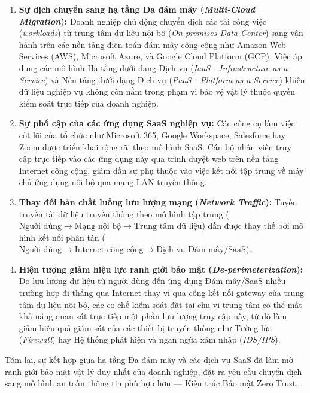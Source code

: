 \begin{enumerate}
    \item \textbf{Sự dịch chuyển sang hạ tầng Đa đám mây (\textit{Multi-Cloud Migration}):} Doanh nghiệp chủ động chuyển dịch các tải công việc (\textit{workloads}) từ trung tâm dữ liệu nội bộ (\textit{On-premises Data Center}) sang vận hành trên các nền tảng điện toán đám mây công cộng như Amazon Web Services (AWS), Microsoft Azure, và Google Cloud Platform (GCP). Việc áp dụng các mô hình Hạ tầng dưới dạng Dịch vụ (\textit{IaaS - Infrastructure as a Service}) và Nền tảng dưới dạng Dịch vụ (\textit{PaaS - Platform as a Service}) khiến dữ liệu nghiệp vụ không còn nằm trong phạm vi bảo vệ vật lý thuộc quyền kiểm soát trực tiếp của doanh nghiệp.
    
    \item \textbf{Sự phổ cập của các ứng dụng SaaS nghiệp vụ:} Các công cụ làm việc cốt lõi của tổ chức như Microsoft 365, Google Workspace, Salesforce hay Zoom được triển khai rộng rãi theo mô hình SaaS. Cán bộ nhân viên truy cập trực tiếp vào các ứng dụng này qua trình duyệt web trên nền tảng Internet công cộng, giảm dần sự phụ thuộc vào việc kết nối tập trung về máy chủ ứng dụng nội bộ qua mạng LAN truyền thống.
    
    \item \textbf{Thay đổi bản chất luồng lưu lượng mạng (\textit{Network Traffic}):} Tuyến truyền tải dữ liệu truyền thống theo mô hình tập trung ($\text{Người dùng} \rightarrow \text{Mạng nội bộ} \rightarrow \text{Trung tâm dữ liệu}$) dần được thay thế bởi mô hình kết nối phân tán ($\text{Người dùng} \rightarrow \text{Internet công cộng} \rightarrow \text{Dịch vụ Đám mây/SaaS}$).
    
    \item \textbf{Hiện tượng giảm hiệu lực ranh giới bảo mật (\textit{De-perimeterization}):} Do lưu lượng dữ liệu từ người dùng đến ứng dụng Đám mây/SaaS nhiều trường hợp đi thẳng qua Internet thay vì qua cổng kết nối gateway của trung tâm dữ liệu nội bộ, các cơ chế kiểm soát đặt tại chu vi trung tâm có thể mất khả năng quan sát trực tiếp một phần lưu lượng truy cập này, từ đó làm giảm hiệu quả giám sát của các thiết bị truyền thống như Tường lửa (\textit{Firewall}) hay Hệ thống phát hiện và ngăn ngừa xâm nhập (\textit{IDS/IPS}).
\end{enumerate}

Tóm lại, sự kết hợp giữa hạ tầng Đa đám mây và các dịch vụ SaaS đã làm mờ ranh giới bảo mật vật lý duy nhất của doanh nghiệp, đặt ra yêu cầu chuyển dịch sang mô hình an toàn thông tin phù hợp hơn — Kiến trúc Bảo mật Zero Trust.

